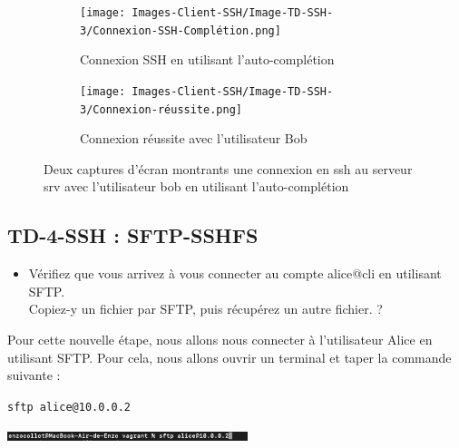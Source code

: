 \documentclass[12pt]{article}
\begin{document}
\begin{figure}[h]
  \centering
  \begin{subfigure}{0.30\textwidth}
    \centering
    \texttt{[image: Images-Client-SSH/Image-TD-SSH-3/Connexion-SSH-Complétion.png]}
    \caption{Connexion SSH en utilisant l'auto-complétion}
  \end{subfigure}
  \vspace{0.9cm} %
  \begin{subfigure}{0.45\textwidth}
    \centering
    \texttt{[image: Images-Client-SSH/Image-TD-SSH-3/Connexion-réussite.png]}
    \caption{Connexion réussite avec l'utilisateur Bob}
  \end{subfigure}
  \caption{Deux captures d'écran montrants une connexion en ssh au serveur srv avec l'utilisateur bob en utilisant l'auto-complétion}
\end{figure}

\vspace{0.3cm}

\subsection{TD-4-SSH : SFTP-SSHFS}

\begin{itemize}
  \item Vérifiez que vous arrivez à vous connecter au compte alice@cli en utilisant SFTP. \\ 
  Copiez-y un fichier par SFTP, puis récupérez un autre fichier. ?
\end{itemize}

\vspace{0.3cm}

Pour cette nouvelle étape, nous allons nous connecter à l'utilisateur Alice en utilisant SFTP. Pour cela, nous allons ouvrir un terminal et taper la commande suivante :

\texttt{sftp alice@10.0.0.2}

\vspace{0.3cm}

\begin{center}
  \includegraphics[width=7cm]{Images-Client-SSH/Image-TD-SSH-4/commande-sftp.png}
\end{center}

\vspace{0.3cm}
\end{document}
